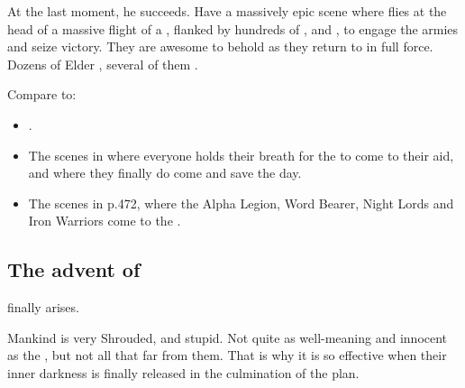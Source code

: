 At the last moment, he succeeds. 
Have a massively epic scene where \Ishnaruchaefir{} flies at the head of a massive flight of a \dragons, flanked by hundreds of \rachyths, \drakes{} and \pdaemons, to engage the \bane{} armies and seize victory.
They are awesome to behold as they return to \Miith in full force. 
Dozens of Elder \Dragons, several of them \shaeeroth.

Compare to: 

\begin{itemize}
  \item 
    . 
  \item 
    The scenes in  where everyone holds their breath for the \dragons{} to come to their aid, and where they finally do come and save the day.
  \item 
    The scenes in  p.472, where the Alpha Legion, Word Bearer, Night Lords and Iron Warriors come to the . 
\end{itemize}







\subsection{The advent of \Lithrim}
\Lithrim{} finally arises. 

Mankind is very Shrouded, \naive{} and stupid. 
Not quite as well-meaning and {innocent} as the \scathae, but not all that far from them.
That is why it is so effective when their inner \Erebean{} darkness is finally released in the culmination of the \Morbus{} plan. 


